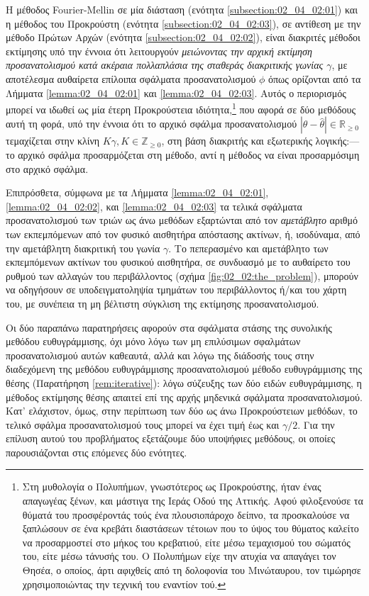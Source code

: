 Η μέθοδος Fourier-Mellin σε μία διάσταση (ενότητα \ref{subsection:02_04_02:01})
και η μέθοδος του Προκρούστη (ενότητα \ref{subsection:02_04_02:03}), σε
αντίθεση με την μέθοδο Πρώτων Αρχών (ενότητα \ref{subsection:02_04_02:02}),
είναι διακριτές μέθοδοι εκτίμησης υπό την έννοια ότι λειτουργούν
\textit{μειώνοντας την αρχική εκτίμηση προσανατολισμού κατά ακέραια πολλαπλάσια
της σταθεράς διακριτικής γωνίας $\gamma$}, με αποτέλεσμα αυθαίρετα επίλοιπα
σφάλματα προσανατολισμού $\phi$ όπως ορίζονται από τα Λήμματα
\ref{lemma:02_04_02:01} και \ref{lemma:02_04_02:03}. Αυτός ο περιορισμός
μπορεί να ιδωθεί ως μία έτερη Προκρούστεια ιδιότητα,\footnote{Στη μυθολογία ο
Πολυπήμων, γνωστότερος ως Προκρούστης, ήταν ένας απαγωγέας ξένων, και μάστιγα
της Ιεράς Οδού της Αττικής. Αφού φιλοξενούσε τα θύματά του προσφέροντάς τούς
ένα πλουσιοπάροχο δείπνο, τα προσκαλούσε να ξαπλώσουν σε ένα κρεβάτι διαστάσεων
τέτοιων που το ύψος του θύματος καλείτο να προσαρμοστεί στο μήκος του
κρεβατιού, είτε μέσω τεμαχισμού του σώματός του, είτε μέσω τάνυσής του. Ο
Πολυπήμων είχε την ατυχία να απαγάγει τον Θησέα, ο οποίος, άρτι αφιχθείς από τη
δολοφονία του Μινώταυρου, τον τιμώρησε χρησιμοποιώντας την τεχνική του εναντίον
τού.} που αφορά σε δύο μεθόδους αυτή τη φορά, υπό την έννοια ότι το αρχικό
σφάλμα προσανατολισμού $|\theta - \hat{\theta}| \in \mathbb{R}_{\geq 0}$
τεμαχίζεται στην κλίνη $K\gamma, K \in \mathbb{Z}_{\geq 0}$, στη βάση διακριτής
και εξωτερικής λογικής:---το αρχικό σφάλμα προσαρμόζεται στη μέθοδο, αντί η
μέθοδος να είναι προσαρμόσιμη στο αρχικό σφάλμα.

Επιπρόσθετα, σύμφωνα με τα Λήμματα \ref{lemma:02_04_02:01},
\ref{lemma:02_04_02:02}, και \ref{lemma:02_04_02:03} τα τελικά σφάλματα
προσανατολισμού των τριών ως άνω μεθόδων εξαρτώνται από τον \textit{αμετάβλητο}
αριθμό των εκπεμπόμενων από τον φυσικό αισθητήρα απόστασης ακτίνων, ή,
ισοδύναμα, από την αμετάβλητη διακριτική του γωνία $\gamma$. Το πεπερασμένο και
αμετάβλητο των εκπεμπόμενων ακτίνων του φυσικού αισθητήρα, σε συνδυασμό με το
αυθαίρετο του ρυθμού των αλλαγών του περιβάλλοντος (σχήμα
\ref{fig:02_02:the_problem}), μπορούν να οδηγήσουν σε υποδειγματοληψία τμημάτων
του περιβάλλοντος ή/και του χάρτη του, με συνέπεια τη μη βέλτιστη σύγκλιση της
εκτίμησης προσανατολισμού.

Οι δύο παραπάνω παρατηρήσεις αφορούν στα σφάλματα στάσης της συνολικής μεθόδου
ευθυγράμμισης, όχι μόνο λόγω των μη επιλύσιμων σφαλμάτων προσανατολισμού αυτών
καθεαυτά, αλλά και λόγω της διάδοσής τους στην διαδεχόμενη της μεθόδου
ευθυγράμμισης προσανατολισμού μέθοδο ευθυγράμμισης της θέσης (Παρατήρηση
\ref{rem:iterative}): λόγω σύζευξης των δύο ειδών ευθυγράμμισης, η μέθοδος
εκτίμησης θέσης απαιτεί επί της αρχής μηδενικά σφάλματα προσανατολισμού. Κατ'
ελάχιστον, όμως, στην περίπτωση των δύο ως άνω Προκρούστειων μεθόδων, το τελικό
σφάλμα προσανατολισμού τους μπορεί να έχει τιμή έως και $\gamma/2$. Για την
επίλυση αυτού του προβλήματος εξετάζουμε δύο υποψήφιες μεθόδους, οι οποίες
παρουσιάζονται στις επόμενες δύο ενότητες.



